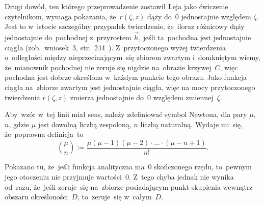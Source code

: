 \documentclass[a4paper,11pt]{article}
\numberwithin{equation}{section}
\begin{document}
Drugi dowód, ten którego przeprowadzenie zostawił Leja jako ćwiczenie
czytelnikom, wymaga pokazania, że~$r( \zeta, z )$ dąży do~$0$
jednostajnie względem $\zeta$. Jest to w~istocie szczególny przypadek
twierdzenie, że~iloraz różnicowy dąży jednostajnie do~pochodnej
z~przyrostem $\vec{ h }$, jeśli ta~pochodna jest jednostajnie ciągła
(zob.~wniosek~3,
str.~244~\cite{SchwartzKursAnalizyMatematycznejVolI1979}).
Z~przytoczonego wyżej twierdzenia o~odległości między
nieprzecinającym~się zbiorem zwartym i~domkniętym wiemy, że~mianownik
pochodnej nie zeruje się nigdzie na~obrazie krzywej~$C$, więc pochodna
jest dobrze określona w~każdym punkcie tego obrazu. Jako funkcja
ciągła na~zbiorze zwartym jest jednostajnie ciągła, więc na mocy
przytoczonego twierdzenia $r( \zeta, z )$ zmierza jednostajnie do~$0$
względem zmiennej~$\zeta$.

\VerSpaceFour





\noindent
{} Aby~wzór w~tej linii miał sens, należy zdefiniować
symbol Newtona, dla pary $\mu$, $n$, gdzie $\mu$ jest dowolną liczbą zespoloną,
$n$ liczbą naturalną. Wydaje mi~się, że~poprawna definicja~to
\begin{equation}
  \label{eq:Leja-Funkcje-zespolone-43}
  \binom{ \mu }{ n } :=
  \frac{ \mu ( \mu - 1 ) ( \mu - 2 ) \cdot \ldots \cdot ( \mu - n + 1 ) }{ n! }.
\end{equation}

\VerSpaceFour





\noindent
{} Pokazano tu, że~jeśli funkcja analityczna ma~0 skończonego rzędu,
to~pewnym jego otoczeniu nie przyjmuje wartości~0. Z~tego chyba jednak nie
wynika od~razu, że~jeśli zeruje~się na~zbiorze posiadającym punkt skupienia
wewnątrz obszaru określoności~$D$, to~zeruje~się w~całym~$D$.
\end{document}

